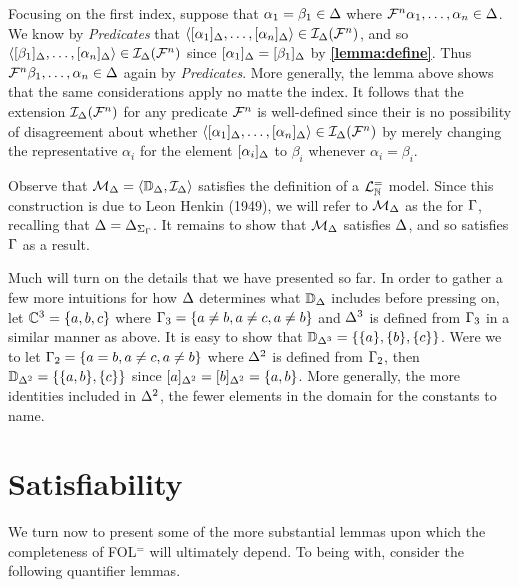 Focusing on the first index, suppose that $\alpha_1=\beta_1\in\Delta$ where $\mathcal{F}^n\alpha_1,\ldots,\alpha_n\in\Delta$. 
We know by \textit{Predicates} that $\langle[\alpha_1]_{\Delta},\ldots,[\alpha_n]_{\Delta}\rangle\in\mathcal{I}_{\Delta}(\mathcal{F}^n)$, and so $\langle[\beta_1]_{\Delta},\ldots,[\alpha_n]_{\Delta}\rangle\in\mathcal{I}_{\Delta}(\mathcal{F}^n)$ since $[\alpha_1]_{\Delta}=[\beta_1]_{\Delta}$ by \textbf{\ref{lemma:define}}.
Thus $\mathcal{F}^n\beta_1,\ldots,\alpha_n\in\Delta$ again by \textit{Predicates}. 
More generally, the lemma above shows that the same considerations apply no matte the index. 
It follows that the extension $\mathcal{I}_{\Delta}(\mathcal{F}^n)$ for any predicate $\mathcal{F}^n$ is well-defined since their is no possibility of disagreement about whether $\langle[\alpha_1]_{\Delta},\ldots,[\alpha_n]_{\Delta}\rangle\in\mathcal{I}_{\Delta}(\mathcal{F}^n)$ by merely changing the representative $\alpha_i$ for the element $[\alpha_i]_{\Delta}$ to $\beta_i$ whenever $\alpha_i = \beta_i$.

Observe that $\mathcal{M}_{\Delta}=\langle\mathbb{D}_{\Delta},\mathcal{I}_{\Delta}\rangle$ satisfies the definition of a $\mathcal{L}^{=}_{\mathbb{N}}$ model.
Since this construction is due to Leon Henkin (1949), we will refer to $\mathcal{M}_{\Delta}$ as the  for $\Gamma$, recalling that $\Delta=\Delta_{\Sigma_{\Gamma}}$.
It remains to show that $\mathcal{M}_{\Delta}$ satisfies $\Delta$, and so satisfies $\Gamma$ as a result.

Much will turn on the details that we have presented so far. %
In order to gather a few more intuitions for how $\Delta$ determines what $\mathbb{D}_{\Delta}$ includes before pressing on, let $\mathbb{C}^3 = \lbrace a, b, c\rbrace$ where $\Gamma_3 = \lbrace a \neq b, a \neq c, a \neq b\rbrace$ and $\Delta^3$ is defined from $\Gamma_3$ in a similar manner as above.
It is easy to show that $\mathbb{D}_{\Delta^3} = \lbrace\lbrace a\rbrace,\lbrace b\rbrace,\lbrace c\rbrace\rbrace$.
Were we to let $\Gamma_2 = \lbrace a = b, a \neq c, a \neq b\rbrace$ where $\Delta^2$ is defined from $\Gamma_2$, then $\mathbb{D}_{\Delta^2} = \lbrace\lbrace a, b\rbrace,\lbrace c\rbrace\rbrace$ since $[a]_{\Delta^2} = [b]_{\Delta^2} = \lbrace a, b\rbrace$.
More generally, the more identities included in $\Delta^2$, the fewer elements in the domain for the constants to name.






\section{Satisfiability}%
  \label{sec:Satisfiability}

We turn now to present some of the more substantial lemmas upon which the completeness of FOL$^=$ will ultimately depend. 
To being with, consider the following quantifier lemmas.

